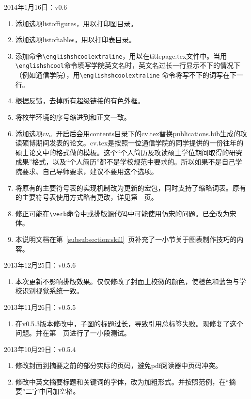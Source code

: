 \noindent
2014年1月16日：v0.6
\begin{enumerate}
\item 添加选项listoffigures，用以打印图目录。
\item 添加选项listoftables，用以打印表目录。
\item 添加命令\verb|\englishshcoolextraline|，用以在titlepage.tex文件中。当用\\ \verb|\englishshcool|命令填写学院英文名时，英文名过长一行显示不下的情况下（例如通信学院），用\verb|\englishshcoolextraline| 命令将写不下的词写在下一行。
\item 根据反馈，去掉所有超级链接的有色外框。
\item 将枚举环境的序号缩进到和正文一致。
\item 添加选项cv。开启后会用contents目录下的cv.tex替换publications.bib生成的攻读硕博期间发表的论文。cv.tex是按照一位通信学院的同学提供的一份往年的硕士论文中的格式做的模板。这个“个人简历及攻读硕士学位期间取得的研究成果”格式，以及“个人简历”都不是学校规范中要求的。所以如果不是自己学院要求、自己导师要求，建议不要用这个选项。
\item 将原有的主要符号表的实现机制改为更新的宏包，同时支持了缩略词表。原有的主要符号表使用方式略有更改，详见第~\pageref{subsection:glossaries}~页。
\item 修正可能在\verb|\verb|命令中或排版源代码中可能使用仿宋的问题。已全改为宋体。
\item 本说明文档在第~\ref{subsubsection:skill}~页补充了一小节关于图表制作技巧的内容。
\end{enumerate}

\noindent
2013年12月25日：v0.5.6
\begin{enumerate}
\item 本次更新不影响排版效果。仅仅修改了封面上校徽的颜色，使橙色和蓝色与学校识别视觉系统一致。
\end{enumerate}

\noindent
2013年11月26日：v0.5.5
\begin{enumerate}
\item 在v0.5.3版本修改中，子图的标题过长，导致引用总标签失败。现修复了这个问题。并在第~\pageref{testpicslabel}~页进行了一小段测试。
\end{enumerate}

\noindent
2013年10月29日：v0.5.4
\begin{enumerate}
\item 修改封面到摘要之前的部分实际的页码，避免pdf阅读器中页码冲突。
\item 修改中英文摘要标题和关键词的字体，改为加粗形式。并按照范例，在“摘要”二字中间加空格。
\end{enumerate}

